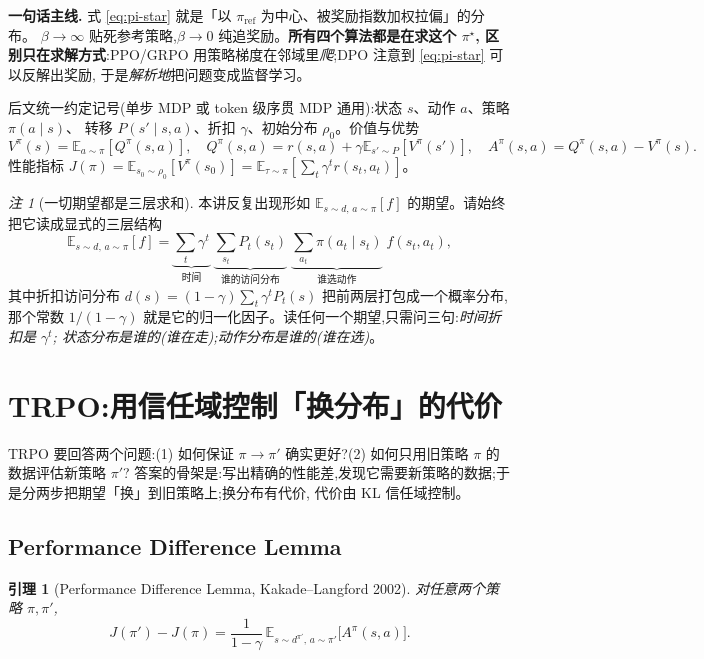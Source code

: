 \documentclass[11pt]{article}
\newcommand{\E}{\mathbb{E}}
\newcommand{\Ap}{A^{\pi}}
\newcommand{\Vp}{V^{\pi}}
\newcommand{\Qp}{Q^{\pi}}
\newcommand{\dpip}{d^{\pi'}}
\newcommand{\piref}{\pi_{\mathrm{ref}}}
\theoremstyle{plain}
\newtheorem{lemma}[theorem]{引理}
\theoremstyle{definition}
\theoremstyle{remark}
\newtheorem{remark}[theorem]{注}
\begin{document}
\begin{keybox}
\textbf{一句话主线.} 式 \eqref{eq:pi-star} 就是「以 $\piref$ 为中心、被奖励指数加权拉偏」的分布。
$\beta\to\infty$ 贴死参考策略,$\beta\to 0$ 纯追奖励。\textbf{所有四个算法都是在求这个 $\pi^\star$,
区别只在求解方式}:PPO/GRPO 用策略梯度在邻域里\emph{爬};DPO 注意到 \eqref{eq:pi-star} 可以反解出奖励,
于是\emph{解析地}把问题变成监督学习。
\end{keybox}

后文统一约定记号(单步 MDP 或 token 级序贯 MDP 通用):状态 $s$、动作 $a$、策略 $\pi(a\mid s)$、
转移 $P(s'\mid s,a)$、折扣 $\gamma$、初始分布 $\rho_0$。价值与优势
\[
\Vp(s)=\E_{a\sim\pi}[\Qp(s,a)],\quad
\Qp(s,a)=r(s,a)+\gamma\E_{s'\sim P}[\Vp(s')],\quad
\Ap(s,a)=\Qp(s,a)-\Vp(s).
\]
性能指标 $J(\pi)=\E_{s_0\sim\rho_0}[\Vp(s_0)]=\E_{\tau\sim\pi}[\sum_t\gamma^t r(s_t,a_t)]$。

\begin{remark}[一切期望都是三层求和]
本讲反复出现形如 $\E_{s\sim d,\,a\sim\pi}[f]$ 的期望。请始终把它读成显式的三层结构
\[
\E_{s\sim d,\,a\sim\pi}[f]
=\underbrace{\sum_t\gamma^t}_{\text{时间}}\;
\underbrace{\sum_{s_t}P_t(s_t)}_{\text{谁的访问分布}}\;
\underbrace{\sum_{a_t}\pi(a_t\mid s_t)}_{\text{谁选动作}}\;f(s_t,a_t),
\]
其中折扣访问分布 $d(s)=(1-\gamma)\sum_t\gamma^t P_t(s)$ 把前两层打包成一个概率分布,
那个常数 $1/(1-\gamma)$ 就是它的归一化因子。读任何一个期望,只需问三句:\emph{时间折扣是 $\gamma^t$;
状态分布是谁的(谁在走);动作分布是谁的(谁在选)}。
\end{remark}

\section{TRPO:用信任域控制「换分布」的代价}

TRPO 要回答两个问题:(1) 如何保证 $\pi\to\pi'$ 确实更好?(2) 如何只用旧策略 $\pi$ 的数据评估新策略 $\pi'$?
答案的骨架是:写出精确的性能差,发现它需要新策略的数据;于是分两步把期望「换」到旧策略上;换分布有代价,
代价由 KL 信任域控制。

\subsection{Performance Difference Lemma}

\begin{lemma}[Performance Difference Lemma, Kakade--Langford 2002]\label{lem:pdl}
对任意两个策略 $\pi,\pi'$,
\begin{equation}\label{eq:pdl}
J(\pi')-J(\pi)=\frac{1}{1-\gamma}\,\E_{s\sim \dpip,\,a\sim\pi'}\big[\Ap(s,a)\big].
\end{equation}
\end{lemma}
\end{document}
